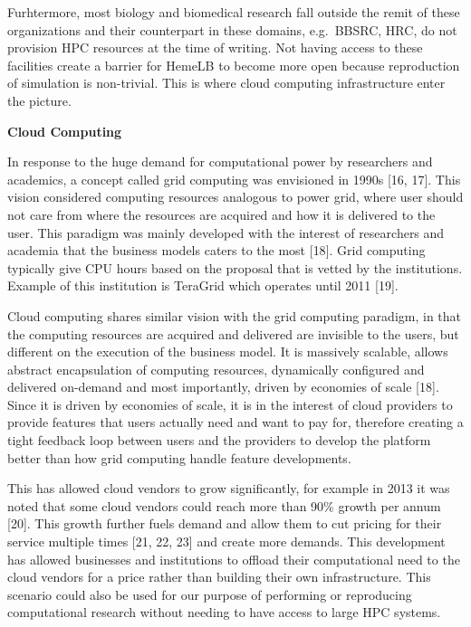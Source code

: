 \documentclass[]{article}
\begin{document}
Furhtermore, most biology and biomedical research fall outside the remit
of these organizations and their counterpart in these domains,
e.g.~BBSRC, HRC, do not provision HPC resources at the time of writing.
Not having access to these facilities create a barrier for HemeLB to
become more open because reproduction of simulation is non-trivial. This
is where cloud computing infrastructure enter the picture.

\textbf{Cloud Computing}

In response to the huge demand for computational power by researchers
and academics, a concept called grid computing was envisioned in 1990s
{[}16, 17{]}. This vision considered computing resources analogous to
power grid, where user should not care from where the resources are
acquired and how it is delivered to the user. This paradigm was mainly
developed with the interest of researchers and academia that the
business models caters to the most {[}18{]}. Grid computing typically
give CPU hours based on the proposal that is vetted by the institutions.
Example of this institution is TeraGrid which operates until 2011
{[}19{]}.

Cloud computing shares similar vision with the grid computing paradigm,
in that the computing resources are acquired and delivered are invisible
to the users, but different on the execution of the business model. It
is massively scalable, allows abstract encapsulation of computing
resources, dynamically configured and delivered on-demand and most
importantly, driven by economies of scale {[}18{]}. Since it is driven
by economies of scale, it is in the interest of cloud providers to
provide features that users actually need and want to pay for, therefore
creating a tight feedback loop between users and the providers to
develop the platform better than how grid computing handle feature
developments.

This has allowed cloud vendors to grow significantly, for example in
2013 it was noted that some cloud vendors could reach more than 90\%
growth per annum {[}20{]}. This growth further fuels demand and allow
them to cut pricing for their service multiple times {[}21, 22, 23{]}
and create more demands. This development has allowed businesses and
institutions to offload their computational need to the cloud vendors
for a price rather than building their own infrastructure. This scenario
could also be used for our purpose of performing or reproducing
computational research without needing to have access to large HPC
systems.
\end{document}
